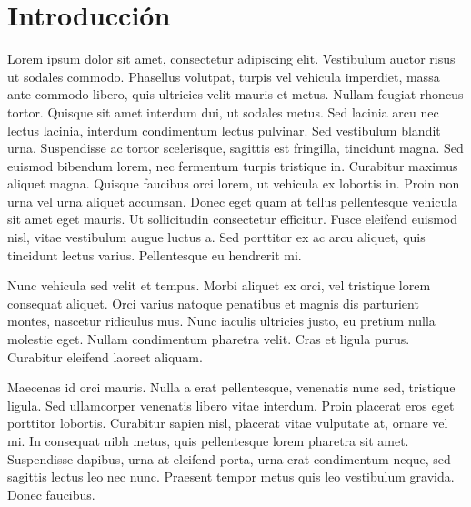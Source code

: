 
\newpage
\clearpage{\pagestyle{empty}\cleardoublepage}
\newpage

\chapter*{\centering \large Introducción} 

Lorem ipsum dolor sit amet, consectetur adipiscing elit. Vestibulum auctor risus ut sodales commodo. Phasellus volutpat, turpis vel vehicula imperdiet, massa ante commodo libero, quis ultricies velit mauris et metus. Nullam feugiat rhoncus tortor. Quisque sit amet interdum dui, ut sodales metus. Sed lacinia arcu nec lectus lacinia, interdum condimentum lectus pulvinar. Sed vestibulum blandit urna. Suspendisse ac tortor scelerisque, sagittis est fringilla, tincidunt magna. Sed euismod bibendum lorem, nec fermentum turpis tristique in. Curabitur maximus aliquet magna. Quisque faucibus orci lorem, ut vehicula ex lobortis in. Proin non urna vel urna aliquet accumsan. Donec eget quam at tellus pellentesque vehicula sit amet eget mauris. Ut sollicitudin consectetur efficitur. Fusce eleifend euismod nisl, vitae vestibulum augue luctus a. Sed porttitor ex ac arcu aliquet, quis tincidunt lectus varius. Pellentesque eu hendrerit mi.

Nunc vehicula sed velit et tempus. Morbi aliquet ex orci, vel tristique lorem consequat aliquet. Orci varius natoque penatibus et magnis dis parturient montes, nascetur ridiculus mus. Nunc iaculis ultricies justo, eu pretium nulla molestie eget. Nullam condimentum pharetra velit. Cras et ligula purus. Curabitur eleifend laoreet aliquam.

Maecenas id orci mauris. Nulla a erat pellentesque, venenatis nunc sed, tristique ligula. Sed ullamcorper venenatis libero vitae interdum. Proin placerat eros eget porttitor lobortis. Curabitur sapien nisl, placerat vitae vulputate at, ornare vel mi. In consequat nibh metus, quis pellentesque lorem pharetra sit amet. Suspendisse dapibus, urna at eleifend porta, urna erat condimentum neque, sed sagittis lectus leo nec nunc. Praesent tempor metus quis leo vestibulum gravida. Donec faucibus.

